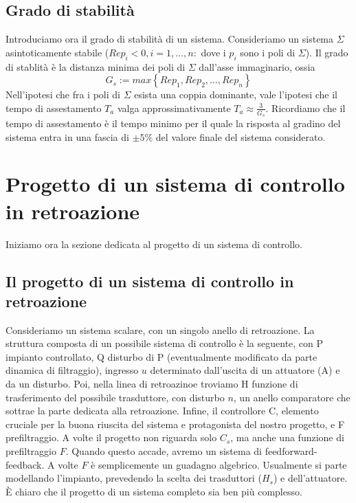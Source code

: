 \documentclass[11pt]{article}
\begin{document}
\subsection{Grado di stabilità}
Introduciamo ora il grado di stabilità di un sistema. Consideriamo un sistema $\Sigma$ asintoticamente stabile ($Re p_i <0, i=1,\dots,n:$ dove i $p_i$ sono i poli di $\Sigma$). Il grado di stablità è la distanza minima dei poli di $\Sigma$ dall'asse immaginario, ossia
\begin{displaymath}
    G_s := max\left\{Rep_1, Re p_2, ..., Re p_n\right\}
\end{displaymath}
Nell'ipotesi che fra i poli di $\Sigma$ esista una coppia dominante, vale l'ipotesi che il tempo di assestamento $T_a$ valga approssimativamente $T_a \approx \frac{3}{G_s}$. Ricordiamo che il tempo di assestamento è il tempo minimo per il quale la risposta al gradino del sistema entra in una fascia di $\pm 5\%$ del valore finale del sistema considerato.
\section{Progetto di un sistema di controllo in retroazione}
Iniziamo ora la sezione dedicata al progetto di un sistema di controllo.
\subsection{Il progetto di un sistema di controllo in retroazione}
Consideriamo un sistema scalare, con un singolo anello di retroazione. La struttura composta di un possibile sistema di controllo è la seguente, con P impianto controllato, Q disturbo di P (eventualmente modificato da parte dinamica di filtraggio), ingresso $u$ determinato dall'uscita di un attuatore (A) e da un disturbo. Poi, nella linea di retroazinoe troviamo H funzione di trasferimento del possibile trasduttore, con disturbo $n$, un anello comparatore che sottrae la parte dedicata alla retroazione. Infine, il controllore C, elemento cruciale per la buona riuscita del sistema e protagonista del nostro progetto, e F prefiltraggio. A volte il progetto non riguarda solo $C_s$, ma anche una funzione di prefiltraggio $F$. Quando questo accade, avremo un sistema di feedforward-feedback. A volte $F$ è semplicemente un guadagno algebrico. Usualmente si parte modellando l'impianto, prevedendo la scelta dei trasduttori ($H_s$) e dell'attuatore.
È chiaro che il progetto di un sistema completo sia ben più complesso.
\end{document}
